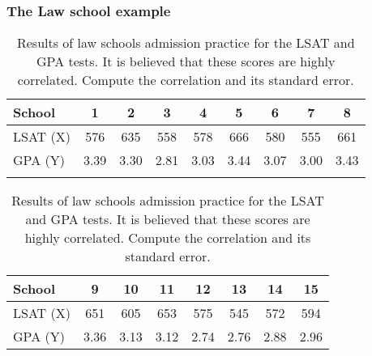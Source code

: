\frame
{
\frametitle{The Law school example}

\begin{table}[!h]
\begin{flushleft}
\begin{tabular}{lcccccccc}
School &   1  &   2 &    3   &  4  &   5  &   6   &  7  &   8  \\
\hline
LSAT (X) & 576  &  635  &  558 &   578  &  666  &  580  &  555   & 661  \\
GPA (Y) &  3.39   &  3.30   &  2.81   &  3.03  &   3.44   &  3.07   &  3.00   &  3.43 \\

&&&&&&&&\\
\end{tabular}

\begin{tabular}{lccccccc}

School &       9   & 10   & 11 &   12  &  13  &  14   & 15 \\
\hline
LSAT (X) &  651   & 605  &  653  &  575   & 545  &  572  &  594 \\
GPA (Y) &    3.36   &  3.13  &   3.12  & 2.74   &  2.76   &  2.88   &  2.96\\

\end{tabular}
\end{flushleft}
\caption{Results of law schools admission practice  for the LSAT and GPA tests. It is believed that these scores are highly correlated. \alert{Compute the correlation and its standard error.}}
\end{table}


}
